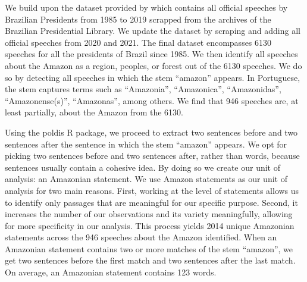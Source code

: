 \documentclass[]{interact}
\theoremstyle{plain}%
\theoremstyle{definition}
\theoremstyle{remark}
\begin{document}
We build upon the dataset provided by \citep{cezar2020} which contains
all official speeches by Brazilian Presidents from 1985 to 2019 scrapped
from the archives of the Brazilian Presidential Library. We update the
dataset by scraping and adding all official speeches from 2020 and 2021.
The final dataset encompasses 6130 speeches for all the presidents of
Brazil since 1985. We then identify all speeches about the Amazon as a
region, peoples, or forest out of the 6130 speeches. We do so by
detecting all speeches in which the stem ``amazon'' appears. In
Portuguese, the stem captures terms such as ``Amazonia'', ``Amazonica'',
``Amazonidas'', ``Amazonense(s)'', ``Amazonas'', among others. We find
that 946 speeches are, at least partially, about the Amazon from the
6130.

Using the poldis R package, we proceed to extract two sentences before
and two sentences after the sentence in which the stem ``amazon''
appears. We opt for picking two sentences before and two sentences
after, rather than words, because sentences usually contain a cohesive
idea. By doing so we create our unit of analysis: an Amazonian
statement. We use Amazon statements as our unit of analysis for two main
reasons. First, working at the level of statements allows us to identify
only passages that are meaningful for our specific purpose. Second, it
increases the number of our observations and its variety meaningfully,
allowing for more specificity in our analysis. This process yields 2014
unique Amazonian statements across the 946 speeches about the Amazon
identified. When an Amazonian statement contains two or more matches of
the stem ``amazon'', we get two sentences before the first match and two
sentences after the last match. On average, an Amazonian statement
contains 123 words.
\end{document}
